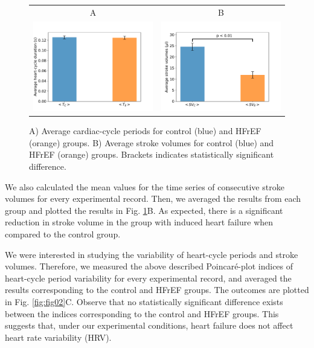 \documentclass[%
preprint,
 amsmath,amssymb,
 aps,
]{revtex4-2}
\begin{document}
\begin{figure}[h!]
    \begin{tabular}{cc}
        A & B \\
        \includegraphics[width=3in]{Fig01_A.pdf} &
        \includegraphics[width=3in]{Fig01_B.pdf}
    \end{tabular}
    \caption{A) Average cardiac-cycle periods for control (blue) and HFrEF (orange) groups. B) Average stroke volumes for control (blue) and HFrEF (orange) groups. Brackets indicates statistically significant difference.}
    \label{fig:fig01}
\end{figure}

We also calculated the mean values for the time series of consecutive stroke volumes for every experimental record. Then, we averaged the results from each group and plotted the results in Fig. \ref{fig:fig01}B. As expected, there is a significant reduction in stroke volume in the group with induced heart failure when compared to the control group.

We were interested in studying the variability of heart-cycle periods and stroke volumes. Therefore, we measured the above described Poincaré-plot indices of heart-cycle period variability for every experimental record, and averaged the results corresponding to the control and HFrEF groups. The outcomes are plotted in Fig. \ref{fig:fig02}C. Observe that no statistically significant difference exists between the indices corresponding to the control and HFrEF groups. This suggests that, under our experimental conditions, heart failure does not affect heart rate variability (HRV). 
\end{document}
